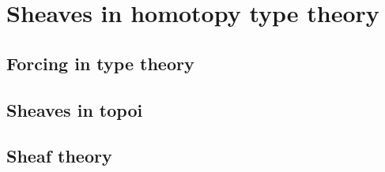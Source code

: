 \chapter{Sheaves in homotopy type theory}
\label{chap:sheaf}

\section{Forcing in type theory}
\label{sec:forcing}

\section{Sheaves in topoi}
\label{sec:sheaf_topos}

\section{Sheaf theory}
\label{sec:sheaf_hott}